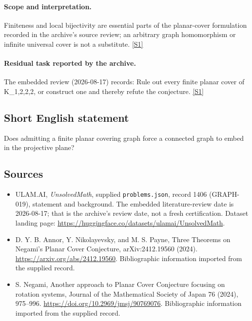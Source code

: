 \documentclass[11pt,a4paper]{article}
\newcommand{\sref}[2]{\hyperlink{source:#1:#2}{[S#2]}}
\begin{document}
\paragraph{Scope and interpretation.}

Finiteness and local bijectivity are essential parts of the planar-cover formulation recorded in the archive’s source review; an arbitrary graph homomorphism or infinite universal cover is not a substitute. \sref{1406}{1}

\paragraph{Residual task reported by the archive.}

The embedded review (2026-08-17) records: Rule out every finite planar cover of K\_{1,2,2,2}, or construct one and thereby refute the conjecture. \sref{1406}{1}

\subsection{Short English statement}

Does admitting a finite planar covering graph force a connected graph to embed in the projective plane?

\subsection{Sources}

{\small

\begin{itemize}

\item[\hypertarget{source:1406:1}{S1}] ULAM.AI, \emph{UnsolvedMath}, supplied \texttt{problems.json}, record 1406 (GRAPH-019), statement and background. The embedded literature-review date is 2026-08-17; that is the archive’s review date, not a fresh certification. Dataset landing page: \url{https://huggingface.co/datasets/ulamai/UnsolvedMath}.

\item[\hypertarget{source:1406:2}{S2}] D. Y. B. Annor, Y. Nikolayevsky, and M. S. Payne, Three Theorems on Negami's Planar Cover Conjecture, arXiv:2412.19560 (2024). \url{https://arxiv.org/abs/2412.19560}. Bibliographic information imported from the supplied record.

\item[\hypertarget{source:1406:3}{S3}] S. Negami, Another approach to Planar Cover Conjecture focusing on rotation systems, Journal of the Mathematical Society of Japan 76 (2024), 975–996. \url{https://doi.org/10.2969/jmsj/90769076}. Bibliographic information imported from the supplied record.

\end{itemize}

}

\label{end:1406}
\end{document}
